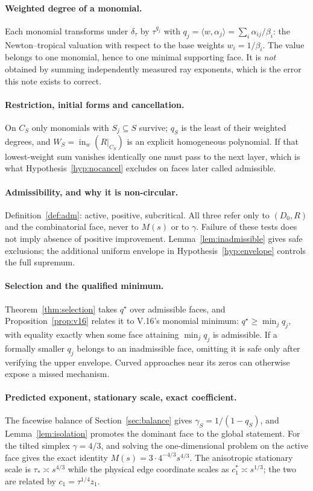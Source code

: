 \documentclass[11pt]{article}
\theoremstyle{definition}
\theoremstyle{remark}
\newcommand{\inw}{\operatorname{in}_w}
\begin{document}
\paragraph{Weighted degree of a monomial.}
Each monomial transforms under $\delta_\tau$ by $\tau^{q_j}$ with
$q_j=\langle w,\alpha_j\rangle=\sum_i\alpha_{ij}/\beta_i$: the
Newton--tropical valuation with respect to the base weights $w_i=1/\beta_i$.
The value belongs to one monomial, hence to one minimal supporting face. It is
\emph{not} obtained by summing independently measured ray exponents, which is
the error this note exists to correct.

\paragraph{Restriction, initial forms and cancellation.}
On $C_S$ only monomials with $S_j\subseteq S$ survive; $q_S$ is the least of
their weighted degrees, and $W_S=\inw(R|_{C_S})$ is an explicit homogeneous
polynomial. If that lowest-weight sum vanishes identically one must pass to
the next layer, which is what Hypothesis~\ref{hyp:nocancel} excludes on faces
later called admissible.

\paragraph{Admissibility, and why it is non-circular.}
Definition~\ref{def:adm}: active, positive, subcritical. All three refer only
to $(D_0,R)$ and the combinatorial face, never to $M(s)$ or to $\gamma$.
Failure of these tests does not imply absence of positive improvement.
Lemma~\ref{lem:inadmissible} gives safe exclusions; the additional uniform
envelope in Hypothesis~\ref{hyp:envelope} controls the full supremum.

\paragraph{Selection and the qualified minimum.}
Theorem~\ref{thm:selection} takes $q^\star$ over admissible faces, and
Proposition~\ref{prop:v16} relates it to V.16's monomial minimum:
$q^\star\ge\min_jq_j$, with equality exactly when some face attaining
$\min_jq_j$ is admissible. If a formally smaller $q_j$ belongs to an
inadmissible face, omitting it is safe only after verifying the upper envelope.
Curved approaches near its zeros can otherwise expose a missed mechanism.

\paragraph{Predicted exponent, stationary scale, exact coefficient.}
The facewise balance of Section~\ref{sec:balance} gives
$\gamma_S=1/(1-q_S)$, and Lemma~\ref{lem:isolation} promotes the dominant face
to the global statement. For the tilted simplex $\gamma=4/3$, and solving the
one-dimensional problem on the active face gives the exact identity
$M(s)=3\cdot4^{-4/3}s^{4/3}$. The anisotropic stationary scale is
$\tau_\ast\asymp s^{4/3}$ while the physical edge coordinate scales as
$c_1^\ast\asymp s^{1/3}$; the two are related by $c_1=\tau^{1/4}z_1$.
\end{document}
